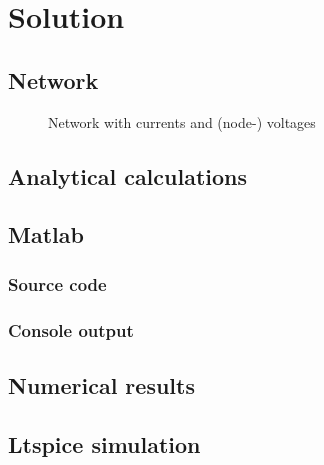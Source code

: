 \documentclass[a4paper]{article}
\begin{document}
\tableofcontents
\listoffigures
\clearpage

\section{Solution}
\subsection{Network}
\begin{figure}[h!] \centering    
\begin{circuitikz}
\end{circuitikz}
\caption{Network with currents and (node-) voltages}
\label{fig:circuit_labeled}
\end{figure}

\newpage
\subsection{Analytical calculations}
\clearpage
\subsection{Matlab}
\subsubsection{Source code}
%  
\subsubsection{Console output}
%  
\vspace{2mm}
\subsection{Numerical results}
\subsection{Ltspice simulation}
\clearpage
\end{document}
